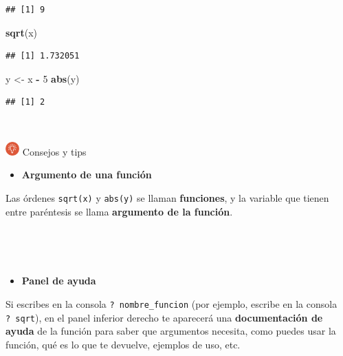\documentclass[11pt,]{book}
\newenvironment{Shaded}{\begin{snugshade}}{\end{snugshade}}
\newcommand{\DecValTok}[1]{\textcolor[rgb]{0.06,0.06,0.06}{#1}}
\newcommand{\KeywordTok}[1]{\textcolor[rgb]{0.27,0.27,0.27}{\textbf{#1}}}
\newcommand{\NormalTok}[1]{#1}
\newcommand{\OperatorTok}[1]{\textcolor[rgb]{0.43,0.43,0.43}{\textbf{#1}}}
\newcommand{\StringTok}[1]{\textcolor[rgb]{0.5,0.5,0.5}{#1}}
\providecommand{\tightlist}{%
  \setlength{\itemsep}{0pt}\setlength{\parskip}{0pt}}
\begin{document}
\begin{verbatim}
## [1] 9
\end{verbatim}

\begin{Shaded}
\begin{Highlighting}[]
\KeywordTok{sqrt}\NormalTok{(x)}
\end{Highlighting}
\end{Shaded}

\begin{verbatim}
## [1] 1.732051
\end{verbatim}

\begin{Shaded}
\begin{Highlighting}[]
\NormalTok{y <-}\StringTok{ }\NormalTok{x }\OperatorTok{-}\StringTok{ }\DecValTok{5}
\KeywordTok{abs}\NormalTok{(y)}
\end{Highlighting}
\end{Shaded}

\begin{verbatim}
## [1] 2
\end{verbatim}

~

\includegraphics[width=0.04\textwidth,height=\textheight]{img/logo_info.png} Consejos y tips

\begin{itemize}
\tightlist
\item
  \textbf{Argumento de una función}
\end{itemize}

Las órdenes \texttt{sqrt(x)} y \texttt{abs(y)} se llaman \textbf{funciones}, y la variable que tienen entre paréntesis se llama \textbf{argumento de la función}.

~

~

\begin{itemize}
\tightlist
\item
  \textbf{Panel de ayuda}
\end{itemize}

Si escribes en la consola \texttt{?\ nombre\_funcion} (por ejemplo, escribe en la consola \texttt{?\ sqrt}), en el panel inferior derecho te aparecerá una \textbf{documentación de ayuda} de la función para saber que argumentos necesita, como puedes usar la función, qué es lo que te devuelve, ejemplos de uso, etc.
\end{document}
